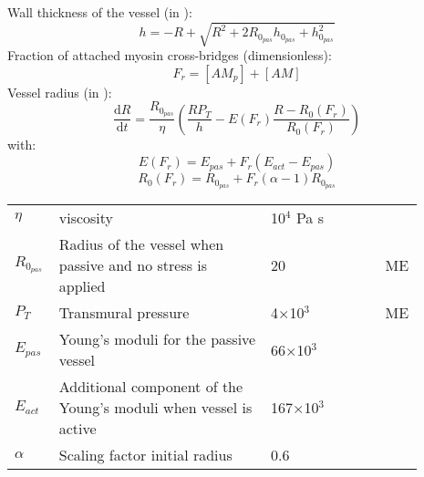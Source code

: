 Wall thickness of the vessel (in \um):
\begin{equation} \label{eq:h2}
h=-R+\sqrt{R^2+2R_{0_{pas}}h_{0_{pas}}+h_{0_{pas}}^2}
\end{equation}
%
Fraction of attached myosin cross-bridges (dimensionless):
\begin{equation}
F_r = [AM_p] + [AM]
\end{equation}
%
Vessel radius (in \um):
\begin{equation} \label{eq:dRdt2e}
\dfrac{\mathrm{d}R}{\mathrm{d}t}= \frac{R_{0_{pas}}}{\eta}\left(   \frac{ R P_{T}}{h}  - E(F_r) \frac{R - R_0(F_r)}{R_0(F_r)} \right)
\end{equation}
%
with:
\begin{equation}
E(F_r)= E_{pas} + F_r \left(E_{act} - E_{pas} \right)
\end{equation}
%
\begin{equation}
R_0(F_r)=R_{0_{pas}} + F_r (\alpha -1) R_{0_{pas}}
\end{equation}
%
\newpage
\begin{table}[t!]
\centering
\begin{tabular}{ p{0.09\linewidth}  >{\footnotesize} p{0.5\linewidth}  >{\footnotesize} p{0.27\linewidth} >{\footnotesize} p{0.03\linewidth} }
\hline
$\eta   $				& viscosity															& 10$^4$ Pa s 		&  \cite{Koenigsberger2006}\\
$R_{0_{pas}}$			& Radius of the vessel when passive and no stress is applied		& 20  \um 		& ME \\
$P_T$					& Transmural pressure												& 4$\times$10$^3$ \Pa		& ME \\
${E}_{pas}$				& Young's moduli for the passive vessel								& 66$\times$10$^3$ \Pa 		&  \cite{Gore1985}\\
${E}_{act}$				& Additional component of the Young's moduli when vessel is active	& 167$\times$10$^3$ \Pa 	& \cite{Gore1985}\\
$\alpha$				& Scaling factor initial radius										& 0.6    		& \cite{Gore1985}\\
\hline
\end{tabular}
\label{tab:crossbridge}
\end{table}
\par
\par
\par
\par 
$~$
$~$
$~$
$~$
$~$
